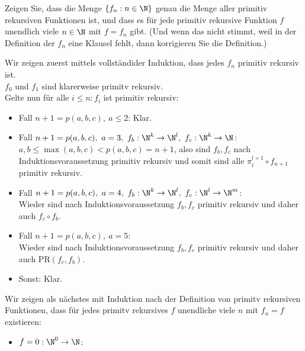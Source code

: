 
\begin{exercise}[205]

Zeigen Sie, dass die Menge $\{f_n: n \in \N\}$ genau die Menge aller primitiv
rekursiven Funktionen ist, und dass es für jede primitiv rekursive Funktion $f$
unendlich viele $n \in \N$ mit $f = f_n$ gibt. (Und wenn das nicht stimmt,
weil in der Definition der $f_n$ eine Klausel fehlt, dann korrigieren Sie
die Definition.)

\end{exercise}


\begin{solution}
Wir zeigen zuerst mittels vollständider Induktion, dass jedes $f_n$ primitiv rekursiv ist. \\
$f_0$ und $f_1$ sind klarerweise primitv rekursiv. \\
Gelte nun für alle $i \leq n: f_i$ ist primitiv rekursiv:
\begin{itemize}
	\item Fall $n + 1 = p(a,b,c),\ a \leq 2$: Klar.
	\item Fall $n + 1 = p(a,b,c),\ a = 3,\ f_b: \N^k \to \N^l,\ f_c: \N^k \to \N$: \\
	$a,b \leq \max(a,b,c) < p(a,b,c) = n+1$, also sind $f_b,f_c$ nach
	Induktionsvoraussetzung primitiv rekursiv und somit sind alle $\pi_i^{l+1} \circ f_{n+1}$
	primitiv rekursiv.
	\item Fall $n + 1 = p(a,b,c),\ a = 4,\ f_b: \N^k \to \N^l,\ f_c: \N^l \to \N^m$: \\
	Wieder sind nach Induktionsvoraussetzung $f_b,f_c$ primitiv rekursiv und daher
	auch $f_c \circ f_b$.
	\item Fall $n + 1 = p(a,b,c),\ a = 5$: \\
	Wieder sind nach Induktionsvoraussetzung $f_b,f_c$ primitiv rekursiv und daher
	auch $\mathrm{PR}(f_c,f_b)$.
	\item Sonst: Klar.
\end{itemize}
Wir zeigen als nächstes mit Induktion nach der Definition von primitv rekursiven
Funktionen, dass für jedes primitv rekursives $f$ unendliche viele $n$ mit $f_n = f$
existieren:
\begin{itemize}
	\item $f = 0: \N^0 \to \N$: \\

\end{itemize}
\end{solution}
